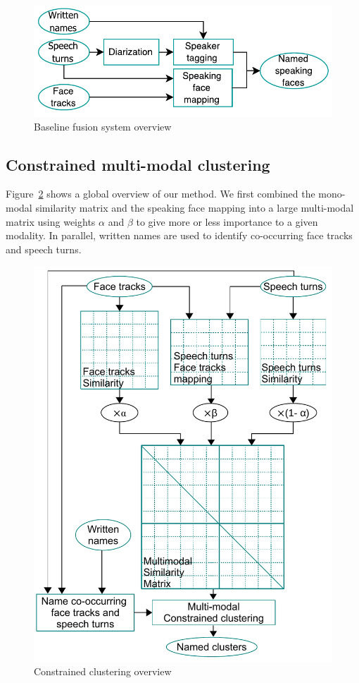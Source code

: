\documentclass{acm_proc_article-me}
\begin{document}
\begin{figure}[htb]
 \centering
 \includegraphics[width=0.9\linewidth]{figs/baseline.pdf}
 \caption {Baseline fusion system overview}
 \label{fig:gene}
\end{figure}


\subsection{Constrained multi-modal clustering}

Figure~\ref{fig:gene} shows a global overview of our method. We first combined the mono-modal similarity matrix and the speaking face mapping into a large multi-modal matrix using weights $\alpha$ and $\beta$ to give more or less importance to a given modality. In parallel, written names are used to identify co-occurring face tracks and speech turns.

\begin{figure}[htb]
 \centering
 \includegraphics[width=0.9\linewidth]{figs/schema_clus_contraint.pdf}
 \caption {Constrained clustering overview}
 \label{fig:gene}
\end{figure}
\end{document}
